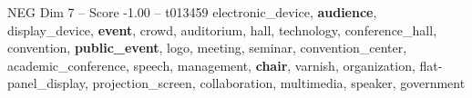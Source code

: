 \begin{textsample}{NEG Dim 7 – Score -1.00 – t013459}  \label{ex:f7_neg_018}
electronic\_device, \textbf{audience}, display\_device, \textbf{event}, crowd, auditorium, hall, technology, conference\_hall, convention, \textbf{public\_event}, logo, meeting, seminar, convention\_center, academic\_conference, speech, management, \textbf{chair}, varnish, organization, flat-panel\_display, projection\_screen, collaboration, multimedia, speaker, government

\end{textsample}
